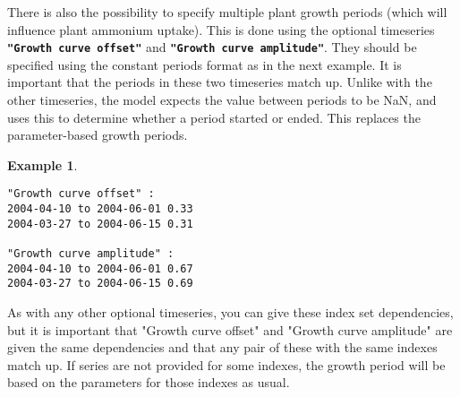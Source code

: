 \documentclass[11pt]{article}
\theoremstyle{definition}
\newtheorem{myexample}{Example}
\newenvironment{example}%
  {\begin{lrbox}{\examplebox}%
   \begin{minipage}{\dimexpr\linewidth-2\fboxsep}
   \begin{myexample}}%
  {\end{myexample}%
   \end{minipage}%
   \end{lrbox}%
   \begin{trivlist}
     \item[]\colorbox{silver}{\usebox\examplebox}
   \end{trivlist}}
\begin{document}
There is also the possibility to specify multiple plant growth periods (which will influence plant ammonium uptake). This is done using the optional timeseries {\tt\bf "Growth curve offset"} and {\tt\bf "Growth curve amplitude"}. They should be specified using the constant periods format as in the next example. It is important that the periods in these two timeseries match up. Unlike with the other timeseries, the model expects the value between periods to be NaN, and uses this to determine whether a period started or ended. This replaces the parameter-based growth periods.

\begin{example}
\begin{lstlisting}
"Growth curve offset" :
2004-04-10 to 2004-06-01 0.33
2004-03-27 to 2004-06-15 0.31

"Growth curve amplitude" :
2004-04-10 to 2004-06-01 0.67
2004-03-27 to 2004-06-15 0.69
\end{lstlisting}
\end{example}

As with any other optional timeseries, you can give these index set dependencies, but it is important that "Growth curve offset" and "Growth curve amplitude" are given the same dependencies and that any pair of these with the same indexes match up. If series are not provided for some indexes, the growth period will be based on the parameters for those indexes as usual.



\end{document}
